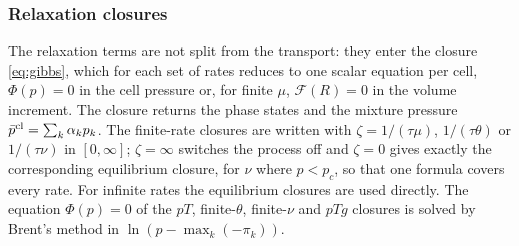 \subsubsection{Relaxation closures}
\label{sec:relaxation}
The relaxation terms are not split from the transport: they enter the closure \eqref{eq:gibbs}, which for each set of
rates reduces to one scalar equation per cell, $\Phi(p)=0$ in the cell pressure or, for finite $\mu$, $\mathcal F(R)=0$ in the
volume increment. The closure returns the phase states and the mixture pressure $\bar p^{\rm cl}=\sum_k\alpha_kp_k$. The finite-rate
closures are written with $\zeta=1/(\tau\mu)$, $1/(\tau\theta)$ or $1/(\tau\nu)$ in $[0,\infty]$; $\zeta=\infty$ switches the process off
and $\zeta=0$ gives exactly the corresponding equilibrium closure, for $\nu$ where $p<p_c$, so that one formula covers every
rate. For infinite rates the equilibrium closures are used directly. The equation $\Phi(p)=0$ of the $pT$, finite-$\theta$,
finite-$\nu$ and $pTg$ closures is solved by Brent's method in $\ln(p-\max_k(-\pi_k))$.

